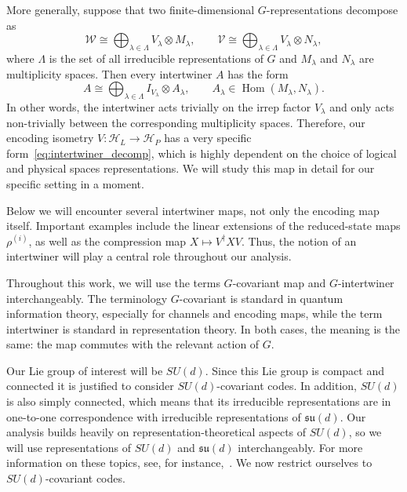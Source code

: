\documentclass[10pt,twocolumn,superscriptaddress,aps,amsmath,amssymb,citeautoscript,floatfix,prx,longbibliography]{revtex4-2}
\theoremstyle{plain}
\theoremstyle{plain}
\theoremstyle{plain}
\theoremstyle{plain}
\theoremstyle{plain}
\theoremstyle{plain}
\begin{document}
More generally, suppose that two finite-dimensional \(G\)-representations decompose as
\[
    \mathcal{W}
    \cong
    \bigoplus_{\lambda\in\Lambda}
    V_\lambda\otimes M_\lambda,
    \qquad
    \mathcal{V}
    \cong
    \bigoplus_{\lambda\in\Lambda}
    V_\lambda\otimes N_\lambda,
\]
where $\Lambda$ is the set of all irreducible representations of $G$ and \(M_\lambda\) and \(N_\lambda\) are multiplicity spaces. Then every intertwiner $A$
has the form
\begin{equation}\label{eq:intertwiner_decomp}
    A
    \cong
    \bigoplus_{\lambda\in\Lambda}
    I_{V_\lambda}\otimes A_\lambda,
    \qquad
    A_\lambda\in \operatorname{Hom}(M_\lambda,N_\lambda).
\end{equation}
In other words, the intertwiner acts trivially on the irrep factor \(V_\lambda\) and only acts non-trivially between the corresponding multiplicity spaces. Therefore, our encoding isometry $V:\mathcal{H}_L\rightarrow \mathcal{H}_P$ has a very specific form~\eqref{eq:intertwiner_decomp}, which is highly dependent on the choice of logical and physical spaces representations. We will study this map in detail for our specific setting in a moment.

Below we will encounter several intertwiner maps, not only the encoding map itself. Important examples include the linear extensions of the reduced-state maps \(\rho^{(i)}\), as well as the compression map
$
X\longmapsto V^\dagger X V .
$
Thus, the notion of an intertwiner will play a central role throughout our analysis.

Throughout this work, we will use the terms \(G\)-covariant map and \(G\)-intertwiner interchangeably. The terminology \(G\)-covariant is standard in quantum information theory, especially for channels and encoding maps, while the term intertwiner is standard in representation theory. In both cases, the meaning is the same: the map commutes with the relevant action of \(G\).

Our Lie group of interest will be $SU(d)$. Since this Lie group is compact and connected it is justified to consider $SU(d)$-covariant codes. In addition, $SU(d)$ is also simply connected, which means that its irreducible representations are in one-to-one correspondence with irreducible representations of $\mathfrak{su}(d)$. Our analysis builds heavily on representation-theoretical aspects of $SU(d)$, so we will use representations of $SU(d)$ and $\mathfrak{su}(d)$ interchangeably. For more information on these topics, see, for instance,~\cite{Hall2015}. We now restrict ourselves to $SU(d)$-covariant codes.
\end{document}
